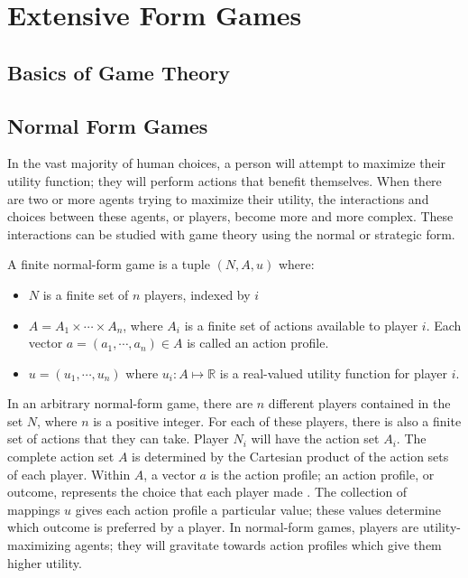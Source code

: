\chapter{Extensive Form Games}
\section{Basics of Game Theory}
\section{Normal Form Games}
In the vast majority of human choices, a person will attempt to maximize their utility function; they will perform actions that benefit themselves. When there are two or more agents trying to maximize their utility, the interactions and choices between these agents, or players, become more and more complex. These interactions can be studied with game theory using the normal or strategic form.
\begin{define}
  A finite normal-form game is a tuple $(N, A, u)$ where:
  \begin{itemize}
  \item $N$ is a finite set of $n$ players, indexed by $i$
  \item $A=A_1\times\cdots\times A_n$, where $A_i$ is a finite set of actions available to player $i$. Each vector $a=(a_1,\cdots ,a_n)\in A$ is called an action profile.
    \item $u=(u_1,\cdots ,u_n)$ where $u_i : A \mapsto\mathbb{R}$ is a real-valued utility function for player $i$.
\end{itemize}
\end{define}

In an arbitrary normal-form game, there are $n$ different players contained in the set $N$, where $n$ is a positive integer. For each of these players, there is also a finite set of actions that they can take. Player $N_i$ will have the action set $A_i$. The complete action set $A$ is determined by the Cartesian product of the action sets of each player. Within $A$, a vector $a$ is the action profile; an action profile, or outcome, represents the choice that each player made \cite{osbo94}. The collection of mappings $u$ gives each action profile a particular value; these values determine which outcome is preferred by a player. In normal-form games, players are utility-maximizing agents; they will gravitate towards action profiles which give them higher utility.\\

